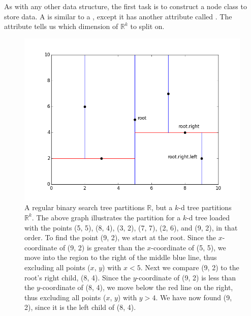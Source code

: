 As with any other data structure, the first task is to construct a node class to store data.
A  is similar to a , except it has another attribute called .
The  attribute tells us which dimension of $\mathbb{R}^k$ to split on.


\begin{figure}[H]
\includegraphics[width=\textwidth]{kdpic1.png}
\caption{A regular binary search tree partitions $\mathbb{R}$, but a $k$-d tree partitions $\mathbb{R}^{k}$. The above graph illustrates the partition for a $k$-d tree loaded with the points (5, 5), (8, 4), (3, 2), (7, 7), (2, 6), and (9, 2), in that order. To find the point (9, 2), we start at the root. Since the $x$-coordinate of (9, 2) is greater than the $x$-coordinate of (5, 5), we move into the region to the right of the middle blue line, thus excluding all points ($x$, $y$) with $x < 5$. Next we compare (9, 2) to the root's right child, (8, 4). Since the $y$-coordinate of (9, 2) is less than the $y$-coordinate of (8, 4), we move below the red line on the right, thus excluding all points ($x$, $y$) with $y > 4$. We have now found (9, 2), since it is the left child of (8, 4).}
\label{fig:k-binary-search}
\end{figure}

